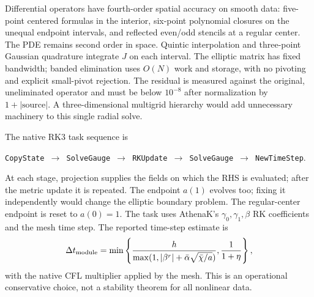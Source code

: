 \documentclass[11pt]{article}
\newcommand{\bc}{\bar\chi}
\newcommand{\ba}{\bar\alpha}
\begin{document}
Differential operators have fourth-order spatial accuracy on smooth data:
five-point centered formulas in the interior, six-point polynomial closures on
the unequal endpoint intervals, and reflected even/odd stencils at a regular
center. The PDE remains second order in space. Quintic interpolation and
three-point Gaussian quadrature integrate $J$ on each interval. The elliptic
matrix has fixed bandwidth; banded elimination uses $O(N)$ work and storage,
with no pivoting and explicit small-pivot rejection. The residual is measured
against the original, uneliminated operator and must be below $10^{-8}$ after
normalization by $1+|\mathrm{source}|$. A three-dimensional multigrid hierarchy
would add unnecessary machinery to this single radial solve.

The native RK3 task sequence is
\begin{center}
\texttt{CopyState $\to$ SolveGauge $\to$ RKUpdate $\to$ SolveGauge $\to$ NewTimeStep}.
\end{center}
At each stage, projection supplies the fields on which the RHS is evaluated;
after the metric update it is repeated. The endpoint $a(1)$ evolves too; fixing
it independently would change the elliptic boundary problem. The regular-center
endpoint is reset to $a(0)=1$. The task uses AthenaK's $\gamma_0,\gamma_1,\beta$
RK coefficients and the mesh time step. The reported time-step estimate is
\begin{equation}
 \Delta t_{\rm module}=\min\left\{\frac{h}{\max(1,|\beta^r|+\ba\sqrt{\bc/a})},
                         \frac1{1+\eta}\right\},
\end{equation}
with the native CFL multiplier applied by the mesh. This is an operational
conservative choice, not a stability theorem for all nonlinear data.
\end{document}
